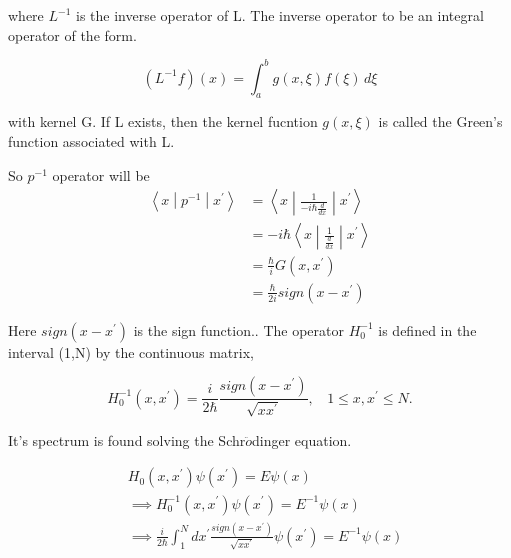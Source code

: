 \documentclass[12pt, letterpaper]{article}
\newcommand*{\1}{\hspace{1pt}}
\begin{document}
        where $L^{-1}$ is the inverse operator of L. The inverse operator to be an integral operator of the form.

        \begin{equation}
            \left(L^{-1}f\right)(x) = \int_{a}^{b} g(x,\xi ) f(\xi) \,d\xi 
        \end{equation}

        with kernel G. If L exists, then the kernel fucntion $g(x,\xi)$ is called the Green's function associated with L.

        So $p^{-1}$ operator will be
        \begin{equation}
            \begin{split}
                \left\langle x\middle|p^{-1}\middle|x^{'}\right\rangle &= \left\langle x\middle| \frac{1}{-i\hbar\frac{d}{dx}}\middle| x^{'}\right\rangle \\ 
                &= -i\hbar\left\langle x\middle| \frac{1}{\frac{d}{dx}}\middle| x^{'}\right\rangle \\
                &= \frac{\hbar}{i}G(x,x^{'}) \\ 
                &= \frac{\hbar}{2i} sign(x-x^{'})
            \end{split}
        \end{equation}

        Here $sign(x-x^{'})$ is the sign function.\cite{s10}. The operator $H_{0}^{-1}$ is defined in the interval (1,N) by the continuous matrix,

        \begin{equation}
            H_{0} ^{-1} (x,x^{'}) = \frac{i}{2\hbar} \frac{sign(x-x^{'})}{\sqrt{x x^{'}}},  \ \ \ \ 1\leqslant x , x^{'} \leqslant N.
        \end{equation}

        It's spectrum is found solving the Schr$\ddot{o}$dinger equation. 

        \begin{equation}
            \begin{split}
                &H_{0}(x,x^{'}) \psi(x^{'}) = E \psi(x) \\ 
                & \implies H_{0} ^{-1}(x,x^{'}) \psi(x^{'}) = E^{-1} \psi(x) \\ 
                & \implies \frac{i}{2\hbar} \int _{1}^{N} dx^{'}\frac{sign(x-x^{'})}{\sqrt{x x^{'}}} \psi(x^{'}) = E^{-1} \psi(x) \\ 
            \end{split}
        \end{equation}
\end{document}
